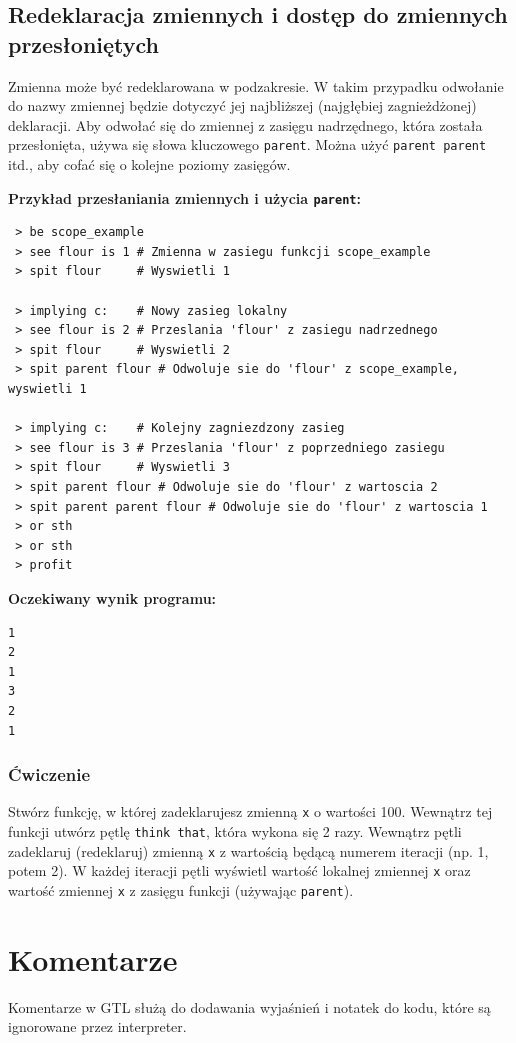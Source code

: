 \documentclass[12pt,a4paper]{article}
\begin{document}
\subsection{Redeklaracja zmiennych i dostęp do zmiennych przesłoniętych}
Zmienna może być redeklarowana w podzakresie. W takim przypadku odwołanie do nazwy zmiennej będzie dotyczyć jej najbliższej (najgłębiej zagnieżdżonej) deklaracji.
Aby odwołać się do zmiennej z zasięgu nadrzędnego, która została przesłonięta, używa się słowa kluczowego \texttt{parent}. Można użyć \texttt{parent parent} itd., aby cofać się o kolejne poziomy zasięgów.

\textbf{Przykład przesłaniania zmiennych i użycia \texttt{parent}:}
\begin{lstlisting}
 > be scope_example
 > see flour is 1 # Zmienna w zasiegu funkcji scope_example
 > spit flour     # Wyswietli 1

 > implying c:    # Nowy zasieg lokalny
 > see flour is 2 # Przeslania 'flour' z zasiegu nadrzednego
 > spit flour     # Wyswietli 2
 > spit parent flour # Odwoluje sie do 'flour' z scope_example, wyswietli 1

 > implying c:    # Kolejny zagniezdzony zasieg
 > see flour is 3 # Przeslania 'flour' z poprzedniego zasiegu
 > spit flour     # Wyswietli 3
 > spit parent flour # Odwoluje sie do 'flour' z wartoscia 2
 > spit parent parent flour # Odwoluje sie do 'flour' z wartoscia 1
 > or sth
 > or sth
 > profit
\end{lstlisting}
\textbf{Oczekiwany wynik programu:}
\begin{verbatim}
1
2
1
3
2
1
\end{verbatim}

\subsubsection*{Ćwiczenie}
Stwórz funkcję, w której zadeklarujesz zmienną \texttt{x} o wartości 100. Wewnątrz tej funkcji utwórz pętlę \texttt{think that}, która wykona się 2 razy. Wewnątrz pętli zadeklaruj (redeklaruj) zmienną \texttt{x} z wartością będącą numerem iteracji (np. 1, potem 2). W każdej iteracji pętli wyświetl wartość lokalnej zmiennej \texttt{x} oraz wartość zmiennej \texttt{x} z zasięgu funkcji (używając \texttt{parent}).

\newpage
\section{Komentarze}
\label{sec:comments}
Komentarze w GTL służą do dodawania wyjaśnień i notatek do kodu, które są ignorowane przez interpreter.
\end{document}

